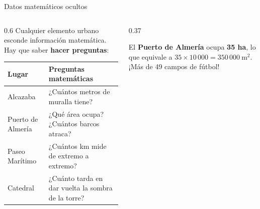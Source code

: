 \documentclass[aspectratio=169, 10pt, spanish]{beamer}
\begin{document}
\begin{frame}{Datos matemáticos ocultos}
  \begin{columns}[T]
    \begin{column}{0.6\textwidth}
      Cualquier elemento urbano esconde información
      matemática. Hay que saber \textbf{hacer preguntas}:
      
      \begin{tabular}{@{}p{2.8cm}p{5cm}@{}}
        \toprule
        \textbf{Lugar} & \textbf{Preguntas matemáticas}\\
        \midrule
        Alcazaba
          & ¿Cuántos metros de muralla tiene?\\[2pt]
        Puerto de Almería
          & ¿Qué área ocupa? ¿Cuántos barcos atraca?\\[2pt]
        Paseo Marítimo
          & ¿Cuántos km mide de extremo a extremo?\\[2pt]
        Catedral
          & ¿Cuánto tarda en dar vuelta la sombra de la torre?\\
        \bottomrule
      \end{tabular}
    \end{column}
    \begin{column}{0.37\textwidth}
      \begin{notabox}
        
        El \textbf{Puerto de Almería} ocupa
        \textbf{35 ha}, lo que equivale a
        $35\times 10\,000 = 350\,000\ \text{m}^2$.
        ¡Más de 49 campos de fútbol!
      \end{notabox}
      
    \end{column}
  \end{columns}
\end{frame}

\end{document}
